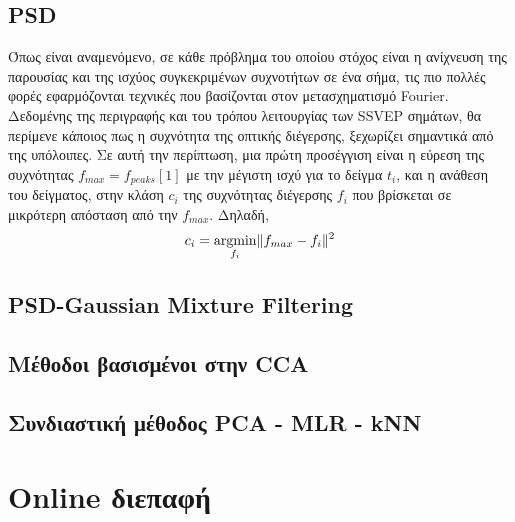 \documentclass[11pt,a4paper,english,greek,twoside]{../Thesis}
\DeclarePairedDelimiter{\norm}{\lVert}{\rVert}
\begin{document}
\subsection{PSD}
\par Όπως είναι αναμενόμενο, σε κάθε πρόβλημα του οποίου στόχος είναι η ανίχνευση της παρουσίας και της ισχύος συγκεκριμένων συχνοτήτων σε ένα σήμα, τις πιο πολλές φορές εφαρμόζονται τεχνικές που βασίζονται στον μετασχηματισμό Fourier. Δεδομένης της περιγραφής και του τρόπου λειτουργίας των SSVEP σημάτων, θα περίμενε κάποιος πως η συχνότητα της οπτικής διέγερσης, ξεχωρίζει σημαντικά από της υπόλοιπες. Σε αυτή την περίπτωση, μια πρώτη προσέγγιση είναι η εύρεση της συχνότητας $f_{max}=f_{peaks}[1]$ με την μέγιστη ισχύ για το δείγμα $t_i$, και η ανάθεση του δείγματος, στην κλάση $c_i$ της συχνότητας διέγερσης $f_i$ που βρίσκεται σε μικρότερη απόσταση από την $f_{max}$. Δηλαδή,
\begin{align}
    \large c_i=\argmin_{f_i} \norm{f_{max}-f_i}^2
\end{align}
\subsection{PSD-Gaussian Mixture Filtering}

\subsection{Μέθοδοι βασισμένοι στην CCA}

\subsection{Συνδιαστική μέθοδος PCA - MLR - kNN}


\section{Online διεπαφή}
\end{document}
